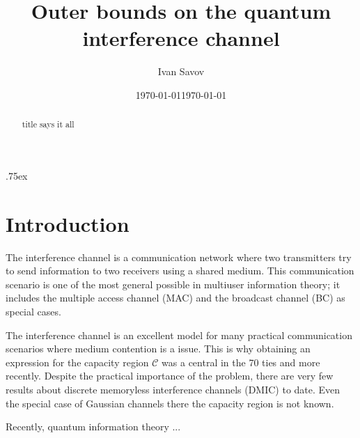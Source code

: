 \documentclass[aps,11pt,twoside,letterpaper]{revtex4}
\begin{document}
\title{{\Large Outer bounds on the quantum interference channel} }
\date{\today} 
\author{Ivan Savov}
\date{\today }



\begin{abstract}
    title says it all
\end{abstract}

\parskip .75ex             %
\maketitle


\section{Introduction}


    The interference channel is a communication network where two transmitters try to send
    information to two receivers using a shared medium. 
    This communication scenario is one of the most general possible in multiuser information
    theory; it includes the multiple access channel (MAC) and the broadcast channel (BC)
    as special cases.
    
    The interference channel is an excellent model for many practical communication scenarios
    where medium contention is a issue. This is why obtaining an expression for the capacity region
    $\mathcal{C}$ was a central in the 70 ties and more recently.
    Despite the practical importance of the problem, there are very few results about 
    discrete memoryless interference channels (DMIC) to date.
    Even the special case of Gaussian channels there the capacity region is not known.
    

    Recently, quantum information theory ...
    
\end{document}
